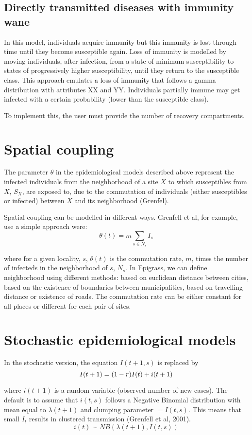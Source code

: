 \documentclass[a4paper,12pt]{article}
\begin{document}
\subsection{Directly transmitted diseases with immunity wane}

In this model, individuals acquire immunity but this immunity is lost through time until they become susceptible again. Loss of immunity is modelled by moving individuals, after infection, from a state of minimum susceptibility to states of progressively higher susceptibility, until they return to the susceptible class. This approach emulates a loss of immunity that follows a gamma distribution with attributes XX and YY. 
Individuals partially immune may get infected with a certain probability (lower than the susceptible class).

To implement this, the user must provide the number of recovery compartments.

\section{Spatial coupling}

The parameter $\theta$ in the epidemiological models described above represent the infected individuals from the neighborhood of a site $X$ to which susceptibles from $X$, $S_X$, are exposed to, due to the commutation of individuals (either susceptibles or infected) between $X$ and its neighborhood (Grenfel).

Spatial coupling can be modelled in different ways. Grenfell et al, for example, use a simple approach were:
$$
\theta(t) = m \sum_{s \in N_s} I_s
$$

where for a given locality, $s$, $\theta(t)$ is the commutation rate, $m$, times the number of infecteds in the neighborhood of $s$, $N_s$. In Epigrass, we can define neighborhood using different methods: based on euclidean distance between cities, based on the existence of boundaries between municipalities, based on travelling distance or existence of roads. The commutation rate can be either constant for all places or different for each pair of sites.   


\section{Stochastic epidemiological models}
In the stochastic version, the equation $I(t+1,s)$ is replaced by
$$
I(t+1) = (1-r) I(t) + i(t+1)\\
$$

where $i(t+1)$ is a random variable (observed number of new cases). The default is to assume that $i(t,s)$  follows a Negative Binomial distribution with mean equal to $\lambda(t+1)$ and clumping parameter $=I(t,s)$. This means that small $I_t$ results in clustered transmission (Grenfell et al, 2001).  
$$
i(t) \sim NB(\lambda(t+1),I(t,s)) 
$$
 
\end{document}
